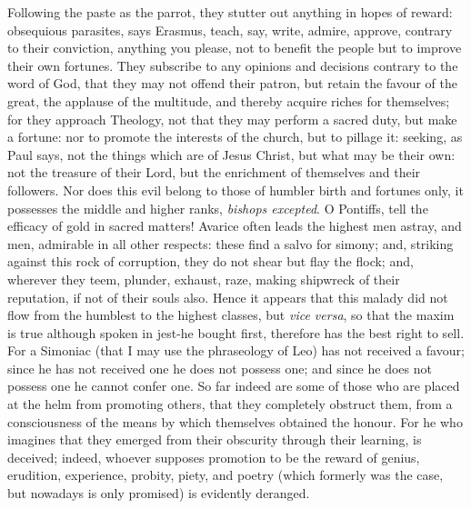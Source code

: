{{Following the paste as the parrot, they stutter out anything in hopes of
reward: obsequious parasites, says Erasmus, teach, say, write, admire, approve,
contrary to their conviction, anything you please, not to benefit the people
but to improve their own fortunes. They subscribe to any opinions and decisions
contrary to the word of God, that they may not offend their patron, but retain
the favour of the great, the applause of the multitude, and thereby acquire
riches for themselves; for they approach Theology, not that they may perform a
sacred duty, but make a fortune: nor to promote the interests of the church,
but to pillage it: seeking, as Paul says, not the things which are of Jesus
Christ, but what may be their own: not the treasure of their Lord, but the
enrichment of themselves and their followers. Nor does this evil belong to
those of humbler birth and fortunes only, it possesses the middle and higher
ranks, \emph{bishops excepted}. O Pontiffs, tell the efficacy of gold in sacred
matters! Avarice often leads the highest men astray, and men, admirable in all
other respects: these find a salvo for simony; and, striking against this rock
of corruption, they do not shear but flay the flock; and, wherever they teem,
plunder, exhaust, raze, making shipwreck of their reputation, if not of their
souls also. Hence it appears that this malady did not flow from the humblest to
the highest classes, but \emph{vice versa}, so that the maxim is true although
spoken in jest-he bought first, therefore has the best right to sell. For a
Simoniac (that I may use the phraseology of Leo) has not received a favour;
since he has not received one he does not possess one; and since he does not
possess one he cannot confer one. So far indeed are some of those who are
placed at the helm from promoting others, that they completely obstruct them,
from a consciousness of the means by which themselves obtained the honour. For
he who imagines that they emerged from their obscurity through their learning,
is deceived; indeed, whoever supposes promotion to be the reward of genius,
erudition, experience, probity, piety, and poetry (which formerly was the case,
but nowadays is only promised) is evidently deranged.

}}
